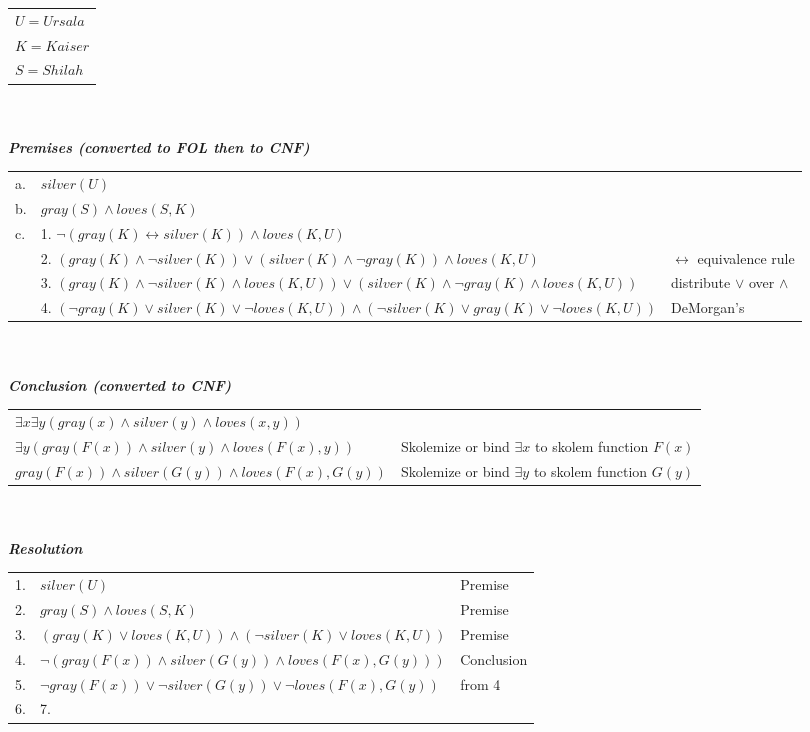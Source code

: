 \documentclass{article}
\begin{document}
\begin{enumerate}
\begin{tabular}{l}
        $U = Ursala$\\
        $K = Kaiser$\\
        $S = Shilah$\\
    \end{tabular}\\\\
    \textit{\textbf{Premises (converted to FOL then to CNF)}}\\
    \begin{tabular}{lll}
        a. & $silver(U)$\\
        b. & $gray(S) \wedge loves(S, K)$\\
        c. & 1. $\neg(gray(K) \leftrightarrow silver(K)) \wedge loves(K, U)$ \\
           & 2. $(gray(K) \wedge \neg silver(K)) \vee (silver(K) \wedge \neg gray(K)) \wedge loves(K, U)$ & $\leftrightarrow$ equivalence rule\\
           & 3. $(gray(K) \wedge \neg silver(K) \wedge loves(K,U)) \vee (silver(K) \wedge \neg gray(K) \wedge loves(K, U))$ & distribute $\vee$ over $\wedge$ \\
           & 4. $(\neg gray(K) \vee silver(K) \vee \neg loves(K,U)) \wedge (\neg silver(K) \vee gray(K) \vee \neg loves(K, U))$ & DeMorgan's

    \end{tabular}\\\\
    \textit{\textbf{Conclusion (converted to CNF)}}\\
    \begin{tabular}{ll}
        $\exists x \exists y (gray(x) \wedge silver(y) \wedge loves(x,y))$\\
        $\exists y (gray(F(x)) \wedge silver(y) \wedge loves(F(x),y))$ & Skolemize or bind $\exists x$ to skolem function $F(x)$\\
        $gray(F(x)) \wedge silver(G(y)) \wedge loves(F(x),G(y))$ & Skolemize or bind $\exists y$ to skolem function $G(y)$\\
    \end{tabular}\\\\
    \textit{\textbf{Resolution}}\\
    \begin{tabular}{lll}
        1. &  $silver(U)$ & Premise\\
        2. & $gray(S) \wedge loves(S, K)$ & Premise\\
        3. & $(gray(K) \vee loves(K, U)) \wedge (\neg silver(K) \vee loves(K, U))$ & Premise\\
        4. & $\neg (gray(F(x)) \wedge silver(G(y)) \wedge loves(F(x),G(y)))$ & Conclusion\\
        5. & $\neg gray(F(x)) \vee \neg silver(G(y)) \vee \neg loves(F(x), G(y))$ & from 4\\
        6. &
        7. &


    \end{tabular}

\end{enumerate}
\end{document}
